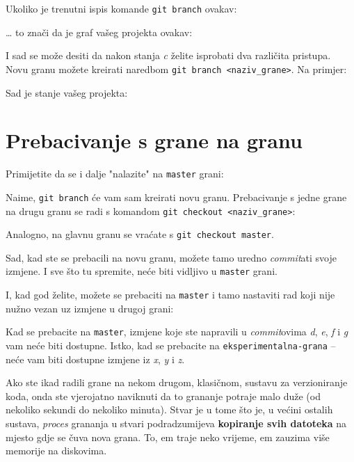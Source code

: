 Ukoliko je trenutni ispis komande \verb+git branch+ ovakav:



\dots{} to znači da je graf vašeg projekta ovakav:



I sad se može desiti da nakon stanja \emph c želite isprobati dva različita pristupa.
Novu granu možete kreirati naredbom \verb+git branch <naziv_grane>+.
Na primjer:


Sad je stanje vašeg projekta:



\section*{Prebacivanje s grane na granu}

Primijetite da se i dalje "nalazite" na \verb+master+ grani:



Naime, \verb+git branch+ će vam sam kreirati novu granu.
Prebacivanje s jedne grane na drugu granu se radi s komandom \verb+git checkout <naziv_grane>+:



Analogno, na glavnu granu se vraćate s \verb+git checkout master+.

Sad, kad ste se prebacili na novu granu, možete tamo uredno \emph{commit}ati svoje izmjene. 
I sve što tu spremite, neće biti vidljivo u \verb+master+ grani.



I, kad god želite, možete se prebaciti na \verb+master+ i tamo nastaviti rad koji nije nužno vezan uz izmjene u drugoj grani:



Kad se prebacite na \verb+master+, izmjene koje ste napravili u \emph{commit}ovima \emph d, \emph e, \emph f i \emph g vam neće biti dostupne.
Istko, kad se prebacite na \verb+eksperimentalna-grana+ -- neće vam biti dostupne izmjene iz \emph x, \emph y i \emph z.

Ako ste ikad radili grane na nekom drugom, klasičnom, sustavu za verzioniranje koda, onda ste vjerojatno naviknuti da to grananje potraje malo duže (od nekoliko sekundi do nekoliko minuta).
Stvar je u tome što je, u većini ostalih sustava, \emph{proces} grananja u stvari podradzumijeva \textbf{kopiranje svih datoteka} na mjesto gdje se čuva nova grana.
To, em traje neko vrijeme, em zauzima više memorije na diskovima.

